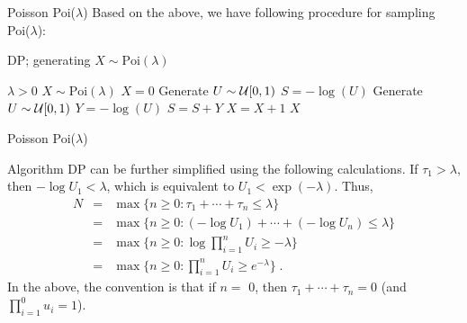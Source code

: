 \documentclass[aspectratio=169]{beamer}
\begin{document}
\begin{frame}{Poisson Poi($\lambda$)}
Based on the above, we have following procedure for sampling Poi($\lambda$):

\begin{algorithm}[H]
\caption{DP; generating $X\sim\mbox{Poi}(\lambda)$}
\label{alg:DP1}
\begin{algorithmic}[1]
\Require $\lambda>0$
\Ensure $X\sim\mbox{Poi}(\lambda)$
\State $X=0$
\State Generate $U\sim {\cal U}[0,1)$
\State $S=-\log(U)$
\State Generate $U\sim {\cal U}[0,1)$
\State  $Y=-\log(U)$
\State  $S=S+Y$
\State  $X=X+1$
\EndWhile
\State \Return $X$
\end{algorithmic}
\end{algorithm}

\end{frame}




\begin{frame}{Poisson Poi($\lambda$)}


Algorithm DP  can be further simplified using the following calculations.
If  $\tau_1> \lambda$,  then  $-\log U_1< \lambda$,
which is equivalent to $U_1< \exp(-\lambda)$. Thus,
\begin{eqnarray*}
N&=&\max\{n\ge0:\tau_1+\cdots+\tau_n\le \lambda\}\\
&=&\max\{n\ge0:(-\log U_1)+\cdots +(-\log U_n)\le \lambda\}\\
&=&\max\{n\ge0: \log \prod_{i=1}^nU_i\ge -\lambda\}\\
&=&\max\{n\ge0: \prod_{i=1}^nU_i\ge e^{-\lambda}\}\;.\label{eq:2Poisson}
\end{eqnarray*}
In the above, the  convention is that if $ n = $ 0, then
$\tau_1+\cdots+\tau_n=0$ (and  $\prod_{i=1}^0u_i=1$).
\end{frame}
\end{document}
